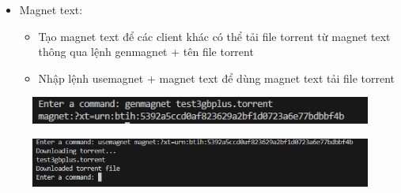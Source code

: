 \documentclass[a4paper]{article}
\begin{document}
\begin{itemize}
    \item Magnet text:
    \begin{itemize}
        \item Tạo magnet text để các client khác có thể tải file torrent từ magnet text thông qua lệnh genmagnet + tên file torrent
        \item Nhập lệnh usemagnet + magnet text để dùng magnet text tải file torrent
    \end{itemize}
\end{itemize}
\begin{figure}[H]
    \centering
    \includegraphics[width=1\textwidth]{images/6.png}
    \captionsetup{labelformat=empty}
\end{figure}
\begin{figure}[H]
    \centering
    \includegraphics[width=1\textwidth]{images/7.png}
    \captionsetup{labelformat=empty}
\end{figure}
\end{document}
